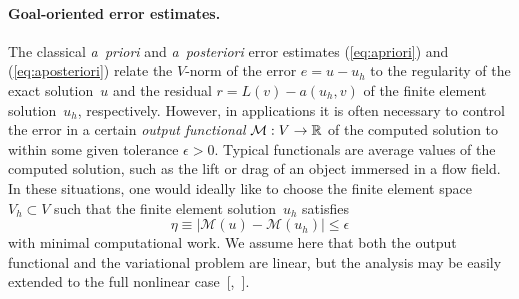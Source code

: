 \vspace*{-6pt}\paragraph{Goal-oriented error estimates.}

The classical \emph{a~priori} and \emph{a~posteriori} error estimates
(\ref{eq:apriori}) and (\ref{eq:aposteriori}) relate the $V$-norm of
the error $e = u - u_h$ to the regularity of the exact solution~$u$
and the residual $r = L(v) - a(u_h, v)$ of the finite element
solution~$u_h$, respectively. However, in applications it is often
necessary to control the error in a certain \emph{output functional}
$\mathcal{M} : V \rightarrow \mathbb{R}$ of the computed solution to within
some given tolerance $\epsilon > 0$. Typical functionals are average
values of the computed solution, such as the lift or drag of an object
immersed in a flow field. In these situations, one would ideally like
to choose the finite element space $V_h \subset V$ such that the
finite element solution~$u_h$ satisfies
\begin{equation}
  \eta \equiv |\mathcal{M}(u) - \mathcal{M}(u_h)| \leqslant \epsilon
\end{equation}
with minimal computational work. We assume here that both the output
functional and the variational problem are linear, but the analysis
may be easily extended to the\vadjust{\pagebreak} full nonlinear
case~[\citeauthor{ErikssonEstepEtAl1995}\citeyear{ErikssonEstepEtAl1995},\,\citeauthor{BeckerRannacher2001}
\citeyear{BeckerRannacher2001}].

